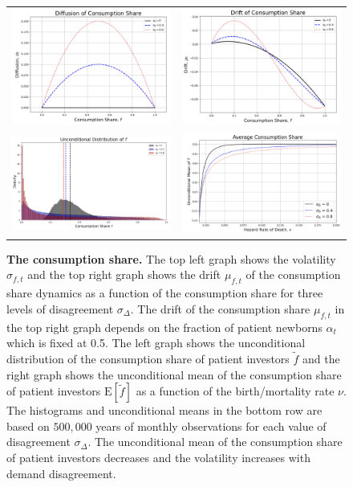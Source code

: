 \documentclass[preprint,11pt,authoryear]{elsarticle}
\theoremstyle{plain}
\begin{document}
\begin{figure}[htbp]
\centering
\vspace{0.1in}
\begin{tabular}{cc}
\includegraphics[width=.3\textwidth]{figuresJFE/ConsumptionShareDiffusion.png} &
\includegraphics[width=.3\textwidth]{figuresJFE/ConsumptionShareDrift.png} \\
\includegraphics[width=.3\textwidth]{figuresJFE/HistConsumptionShare.png} &
\includegraphics[width=.3\textwidth]{figuresJFE/AverageConsumptionShare.png}
\end{tabular}
\caption{\textbf{The consumption share.} The top left graph shows the volatility $\sigma_{f,t}$ and the top right graph shows the drift $\mu_{f,t}$ of the consumption share dynamics as a function of the consumption share for three levels of disagreement $\sigma_{\Delta}$. The drift of the consumption share $\mu_{f,t}$ in the top right graph depends on the fraction of patient newborns $\alpha_t$ which is fixed at 0.5. The left graph shows the unconditional distribution of the consumption share of patient investors $\tilde{f}$ and the right graph shows the unconditional mean of the consumption share of patient investors $\mathrm{E}[\tilde{f}]$ as a function of the birth/mortality rate $\nu$. The histograms and unconditional means in the bottom row are based on $500,000$ years of monthly observations for each value of disagreement $\sigma_{\Delta}$. The unconditional mean of the consumption share of patient investors decreases and the volatility increases with demand disagreement.} \label{fig:ConsumptionShare} 
\end{figure}
\end{document}
